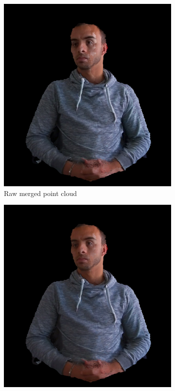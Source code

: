 \begin{figure}[H]
\centering
  \begin{subfigure}[b]{0.32 \textwidth}
    \includegraphics[width=\textwidth]{images/visual_enhancement/colour/processed_raw_colour.png}
    \caption{Raw merged point cloud}
    \label{figure:processed_raw_colour_2}
  \end{subfigure}
  \hfill
  \begin{subfigure}[b]{0.32 \textwidth}
    \includegraphics[width=\textwidth]{images/visual_enhancement/colour/overlap_region_lab.png}

\end{subfigure}
\end{figure}
